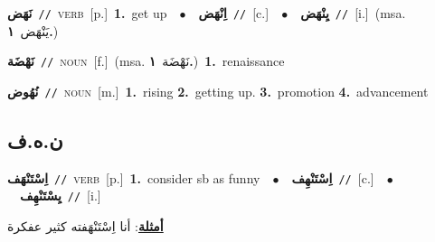 \documentclass[10pt,a4paper,twoside]{article} %
\begin{document}
\begin{multicols}{2}
{\setlength\topsep{0pt}\textbf{\foreignlanguage{arabic}{نَهَض}}\ {\color{gray}\texttt{//}\color{black}}\ \textsc{verb}\ [p.]\ \textbf{1.}~get up\ \ $\bullet$\ \ \setlength\topsep{0pt}\textbf{\foreignlanguage{arabic}{اِنْهَض}}\ {\color{gray}\texttt{//}\color{black}}\ [c.]\ \ $\bullet$\ \ \setlength\topsep{0pt}\textbf{\foreignlanguage{arabic}{يِنْهَض}}\ {\color{gray}\texttt{//}\color{black}}\ [i.]\ \color{gray}(msa. \foreignlanguage{arabic}{يَنْهَض}~\foreignlanguage{arabic}{\textbf{١.}})\color{black}\ } \vspace{2mm}

{\setlength\topsep{0pt}\textbf{\foreignlanguage{arabic}{نَهْضَة}}\ {\color{gray}\texttt{//}\color{black}}\ \textsc{noun}\ [f.]\ \color{gray}(msa. \foreignlanguage{arabic}{نَهْضَة}~\foreignlanguage{arabic}{\textbf{١.}})\color{black}\ \textbf{1.}~renaissance\ } \vspace{2mm}

{\setlength\topsep{0pt}\textbf{\foreignlanguage{arabic}{نُهُوض}}\ {\color{gray}\texttt{//}\color{black}}\ \textsc{noun}\ [m.]\ \textbf{1.}~rising  \textbf{2.}~getting up.  \textbf{3.}~promotion  \textbf{4.}~advancement\ } \vspace{2mm}

\vspace{-3mm}
\subsection*{\color{blue}\foreignlanguage{arabic}{ن.ه.ف}\color{blue}{}} 

{\setlength\topsep{0pt}\textbf{\foreignlanguage{arabic}{اِسْتَنْهَف}}\ {\color{gray}\texttt{//}\color{black}}\ \textsc{verb}\ [p.]\ \textbf{1.}~consider sb as funny\ \ $\bullet$\ \ \setlength\topsep{0pt}\textbf{\foreignlanguage{arabic}{اِسْتَنْهِف}}\ {\color{gray}\texttt{//}\color{black}}\ [c.]\ \ $\bullet$\ \ \setlength\topsep{0pt}\textbf{\foreignlanguage{arabic}{يِسْتَنْهِف}}\ {\color{gray}\texttt{//}\color{black}}\ [i.]\  \begin{flushright}\color{gray}\foreignlanguage{arabic}{\textbf{\underline{\foreignlanguage{arabic}{أمثلة}}}: أنا اِسْتَنْهَفته كثير عفكرة}\end{flushright}\color{black}} \vspace{2mm}


\end{multicols}
\end{document}
